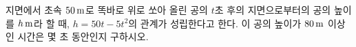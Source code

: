 지면에서 초속 $50\mkern3mu \mathrm{m}$로 똑바로 위로 쏘아 올린 공의 $t$초 후의 지면으로부터의 공의 높이를 $h\mkern3mu \mathrm{m}$라 할 때, $h=50t-5t^2$의 관계가 성립한다고 한다. 이 공의 높이가 $80\mkern3mu \mathrm{m}$ 이상인 시간은 몇 초 동안인지 구하시오.
